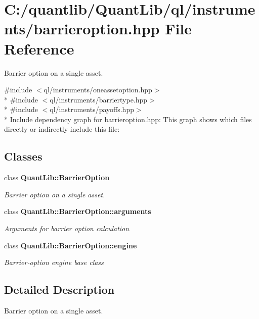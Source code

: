 \section{C\+:/quantlib/\+Quant\+Lib/ql/instruments/barrieroption.hpp File Reference}
\label{barrieroption_8hpp}


Barrier option on a single asset.  


{\ttfamily \#include $<$ql/instruments/oneassetoption.\+hpp$>$}\\*
{\ttfamily \#include $<$ql/instruments/barriertype.\+hpp$>$}\\*
{\ttfamily \#include $<$ql/instruments/payoffs.\+hpp$>$}\\*
Include dependency graph for barrieroption.\+hpp\+:
This graph shows which files directly or indirectly include this file\+:
\subsection*{Classes}
\begin{DoxyCompactItemize}
\item 
class {\bf Quant\+Lib\+::\+Barrier\+Option}
\begin{DoxyCompactList}\small\item\em Barrier option on a single asset. \end{DoxyCompactList}\item 
class {\bf Quant\+Lib\+::\+Barrier\+Option\+::arguments}
\begin{DoxyCompactList}\small\item\em Arguments for barrier option calculation \end{DoxyCompactList}\item 
class {\bf Quant\+Lib\+::\+Barrier\+Option\+::engine}
\begin{DoxyCompactList}\small\item\em Barrier-\/option engine base class \end{DoxyCompactList}\end{DoxyCompactItemize}


\subsection{Detailed Description}
Barrier option on a single asset. 

